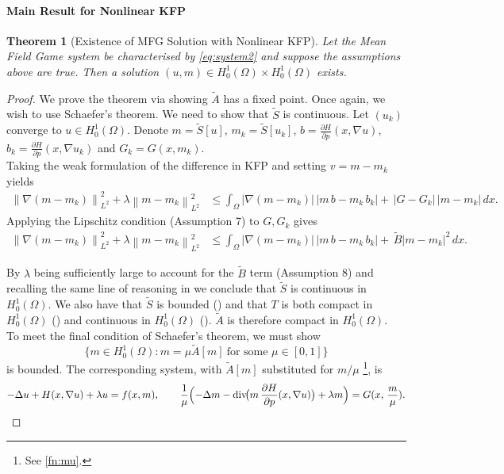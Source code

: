 \documentclass[11pt]{article}
\numberwithin{equation}{section}
\newtheorem{theorem}{Theorem}[section]
\theoremstyle{definition}
\theoremstyle{remark}
\DeclareMathOperator{\diver}{div}
\newcommand{\Honez}{H_0^1(\Omega)}
\newcommand{\Hp}{\frac{\partial H}{\partial p}}
\newcommand{\norm}[1]{\left\lVert #1 \right\rVert}
\begin{document}
\paragraph{Main Result for Nonlinear KFP}
\begin{theorem}[Existence of MFG Solution with Nonlinear KFP]
Let the Mean Field Game system be characterised by \cref{eq:system2} and suppose the assumptions above are true. 
Then a solution $(u,m) \in \Honez \times \Honez$ exists. 
\end{theorem}
\begin{proof}
  We prove the theorem via showing $\tilde{A}$ has a fixed point. 
  Once again, we wish to use Schaefer's theorem. We need to show that $\tilde{S}$ is continuous. 
  Let $(u_k)$ converge to $u \in \Honez$. Denote $m=\tilde{S}[u]$, $m_k=\tilde{S}[u_k]$, $b=\Hp(x, \nabla u)$, $b_k=\Hp(x,\nabla u_k)$ and $G_k = G(x,m_k)$.\\
  Taking the weak formulation of the difference in KFP and setting $v=m-m_k$ yields
  \begin{align*}
  \norm{\nabla(m-m_k)}_{L^2}^2+\lambda\norm{m-m_k}_{L^2}^2
  &\le \int_\Omega |\nabla(m-m_k)|\,\bigl|m\,b - m_k\,b_k\bigr| +\, |G - G_k|\,|m-m_k|\,dx.
  \end{align*}
  Applying the Lipschitz condition (Assumption 7) to $G,G_k$ gives
  \begin{align*}
  \norm{\nabla(m-m_k)}_{L^2}^2+\lambda\norm{m-m_k}_{L^2}^2
  &\le \int_\Omega |\nabla(m-m_k)|\,\bigl|m\,b - m_k\,b_k\bigr| +\, \tilde{B}|m-m_k|^2\,dx.
  \end{align*}

  By $\lambda$ being sufficiently large to account for the $\tilde{B}$ term (Assumption 8) and recalling the same line of reasoning in  we conclude that 
  $\tilde{S}$ is continuous in $\Honez$. 
  We also have that $\tilde{S}$ is bounded () and that $T$ is both compact in $\Honez$ () and continuous in $\Honez$ (). $\tilde{A}$ is therefore
  compact in $\Honez$.\\

  To meet the final condition of Schaefer's theorem, we must show 
  \[\{m\in\Honez: m=\mu \tilde{A}[m]\ \text{for some }\mu\in[0,1]\}\]
  is bounded. 
  The corresponding system, with $\tilde{A}[m]$ substituted for $m/\mu$ \footnote{See \ref{fn:mu}.}, is
  \[-\Delta u + H(x,\nabla u) + \lambda u = f(x,m), \qquad \frac{1}{\mu}\Bigl(-\Delta m - \diver\!\bigl(m\,\Hp(x,\nabla u)\bigr) + \lambda m\Bigr)=G(x,\,\frac{m}{\mu}).\]
  

\end{proof}
\end{document}
